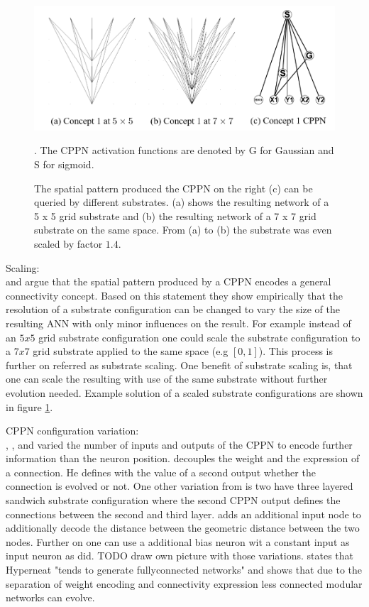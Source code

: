 \begin{figure}[tb]
	\centering
	\includegraphics[width=0.7\linewidth]{figures/HyperNeat/scaling}
	\caption[Exemplar substrate scaling]{ The spatial pattern produced the CPPN on the right (c) can be queried by different substrates. (a) shows the resulting network of a 5 x 5 grid substrate and (b) the resulting network of a 7 x 7 grid substrate on the same space. From (a) to (b) the substrate was even scaled by factor $1.4$.  \cite[p. 14]{HyperNEAT}}. The CPPN activation functions are denoted by G for Gaussian and S for sigmoid.
	\label{fig:scaling}
\end{figure}

Scaling:\\
 \cite{HyperNEAT} and \cite{HyperNEATOctobusArm} argue that the spatial pattern produced by a CPPN encodes a general connectivity concept. Based on this statement they show empirically that the resolution of a substrate configuration can be changed to vary the size of the resulting ANN with only minor influences on the result. For example instead of an $5x5$ grid substrate configuration one could scale the substrate configuration to a $7x7$ grid substrate applied to the same space (e.g $[0,1]$). This process is further on referred as substrate scaling. One benefit of substrate scaling is, that one can scale the resulting with use of the same substrate without further evolution needed. Example solution of a scaled substrate configurations are shown in figure \ref{fig:scaling}.
 
 CPPN configuration variation: \\
 \cite{HyperNEATOctobusArm}, \cite{HyperNEATLeo},\cite{HyperNEATEvolveLearningRules} and \cite{HyperNeat1DSubstrates} varied the number of inputs and outputs of the CPPN to encode further information than the neuron position. \cite{HyperNEATLeo} decouples the weight and the expression of a connection. He defines with the value of a second output whether the connection is evolved or not. One other variation from \cite{HyperNEATOctobusArm}  is two have three layered sandwich substrate configuration where the second CPPN output defines the connections between the second and third layer.\cite{HyperNEAT} adds an additional input node to additionally decode the distance between the geometric distance between the two nodes. Further on one can use a additional bias neuron wit a constant input as input neuron as \cite{HyperNEATEvolveLearningRules} did. TODO draw own picture with those variations.  \cite{HyperNEATLeo} states that Hyperneat "tends to generate fullyconnected networks" and shows that due to the separation of weight encoding and connectivity expression less connected modular networks can evolve.
 

